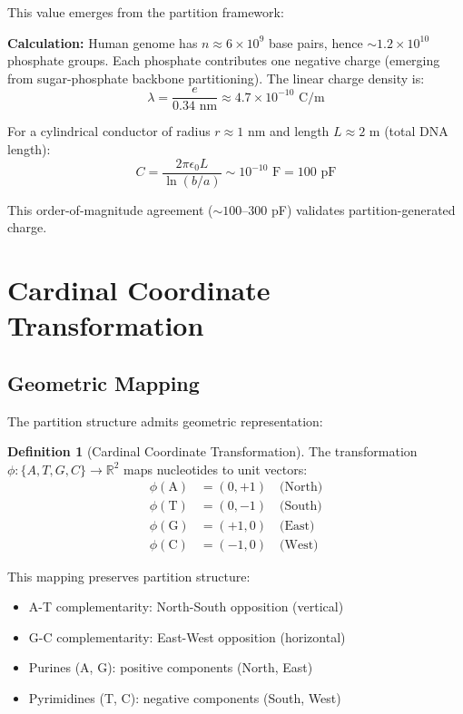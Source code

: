 \documentclass[twocolumn,10pt,a4paper]{article}
\theoremstyle{definition}
\newtheorem{definition}[theorem]{Definition}
\theoremstyle{remark}
\begin{document}
This value emerges from the partition framework:

\textbf{Calculation:} Human genome has $n \approx 6 \times 10^9$ base pairs, hence $\sim 1.2 \times 10^{10}$ phosphate groups. Each phosphate contributes one negative charge (emerging from sugar-phosphate backbone partitioning). The linear charge density is:
\begin{equation}
    \lambda = \frac{e}{0.34 \text{ nm}} \approx 4.7 \times 10^{-10} \text{ C/m}
\end{equation}

For a cylindrical conductor of radius $r \approx 1$ nm and length $L \approx 2$ m (total DNA length):
\begin{equation}
    C = \frac{2\pi\epsilon_0 L}{\ln(b/a)} \sim 10^{-10} \text{ F} = 100 \text{ pF}
\end{equation}

This order-of-magnitude agreement ($\sim 100$--$300$ pF) validates partition-generated charge.

\section{Cardinal Coordinate Transformation}
\label{sec:cardinal}

\subsection{Geometric Mapping}

The partition structure admits geometric representation:

\begin{definition}[Cardinal Coordinate Transformation]
\label{def:cardinal}
The transformation $\phi: \{A, T, G, C\} \to \mathbb{R}^2$ maps nucleotides to unit vectors:
\begin{align}
    \phi(\text{A}) &= (0, +1) \quad \text{(North)} \\
    \phi(\text{T}) &= (0, -1) \quad \text{(South)} \\
    \phi(\text{G}) &= (+1, 0) \quad \text{(East)} \\
    \phi(\text{C}) &= (-1, 0) \quad \text{(West)}
\end{align}
\end{definition}

This mapping preserves partition structure:
\begin{itemize}
    \item A-T complementarity: North-South opposition (vertical)
    \item G-C complementarity: East-West opposition (horizontal)
    \item Purines (A, G): positive components (North, East)
    \item Pyrimidines (T, C): negative components (South, West)
\end{itemize}
\end{document}
